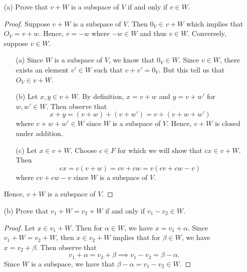 \begin{enumerate}
    \item[(a)] Prove that \( v + W  \) is a subspace of \( V  \) if and only if  \( v \in W  \).
        \begin{proof}
        Suppose \( v + W  \) is a subspace of \( V  \). Then \( 0_{V} \in v + W  \) which implies that \( O_{V} = v + w  \). Hence, \( v = -w  \) where \( -w \in W  \) and thus \( v \in W  \).
        Conversely, suppose \( v \in W  \). 
        \begin{enumerate}
            \item[(a)] Since \( W  \) is a subspace of \( V  \), we know that \( 0_{V} \in W  \). Since \( v \in W  \), there exists an element \( v' \in W  \) such that \( v + v' = 0_{V} \). But this tell us that \( O_{V} \in v + W  \).
            \item[(b)] Let \( x,y \in v + W  \). By definition, \( x = v + w  \) and \( y = v + w' \) for \( w, w' \in W  \). Then observe that
                \[ x + y = (v + w) + (v+w') = v + (v + w + w')  \]
                where \( v + w + w' \in W  \) since \( W  \) is a subspace of \( V  \). Hence, \( v + W  \) is closed under addition.
            \item[(c)] Let \( x \in  v + W  \). Choose \( c \in F  \) for which we will show that \( cx \in v + W  \). Then 
                \[  cx = c (v + w) = cv + cw = v (cv + cw - v ) \]
                where \( cv + cw - v  \) since \( W  \) is a subspace of \( V  \).
        \end{enumerate}
        Hence, \( v + W  \) is a subspace of \( V  \).
        \end{proof} 
    \item[(b)] Prove that \( v_{1} + W =  v_{2} + W  \) if and only if \( v_{1} - v_{2} \in W  \).
        \begin{proof}
        Let \( x \in v_{1} + W  \). Then for \( \alpha \in W  \), we have \( x = v_{1} + \alpha  \). Since \( v_{1} + W = v_{2} + W  \), then \( x \in v_{2} + W  \) implies that for \( \beta \in W  \), we have \( x = v_{2} + \beta  \). Then observe that 
        \[  v_{1} + \alpha = v_{2} + \beta \implies v_{1} - v_{2} = \beta - \alpha.  \]
        Since \( W  \) is a subspace, we have that \(  \beta - \alpha = v_{1} - v_{2} \in W  \).


\end{proof}
\end{enumerate}
